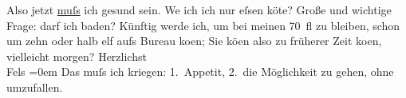 \begin{ledgroupsized}[t]{13cm}
               Also jetzt \uline{muſs} ich gesund sein. We{\geminationn} ich ich nur eſsen kö{\geminationn}te?
               Große und wichtige Frage: darf ich baden?\pend
           \pstart
           Künftig werde ich, um bei meinen 70 fl zu bleiben, schon um zehn oder halb elf aufs
               Bureau ko{\geminationm}en; Sie kö{\geminationn}en
               also zu früherer Zeit ko{\geminationm}en, vielleicht morgen?\pend
           \pstart
           Herzlichst{\\[\baselineskip]}\spacefill\mbox{Fels}\pend
           \leftskip=0em{}\pstart
           \noindent{}Das muſs ich kriegen: 1. Appetit, 2. die Möglichkeit zu gehen, ohne
                  umzufallen.\pend
           
         
         \endnumbering{}\end{ledgroupsized}  \newcommand{\dateiname}{L00154}\newcommand{\titel}{Friedrich M. Fels an Arthur Schnitzler, [1. 1. 1893?]}\newcommand{\editorInnen}{Martin Anton Müller und Gerd-Hermann Susen}
      
